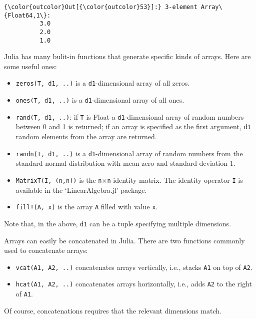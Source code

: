 \documentclass[11pt]{article}
\providecommand{\tightlist}{%
      \setlength{\itemsep}{0pt}\setlength{\parskip}{0pt}}
\begin{document}
\begin{Verbatim}[commandchars=\\\{\}]
{\color{outcolor}Out[{\color{outcolor}53}]:} 3-element Array\{Float64,1\}:
          3.0
          2.0
          1.0
\end{Verbatim}
            
    Julia has many bulit-in functions that generate specific kinds of
arrays. Here are some useful ones:

\begin{itemize}
\tightlist
\item
  \texttt{zeros(T,\ d1,\ ..)} is a \texttt{d1}-dimensional array of all
  zeros.
\item
  \texttt{ones(T,\ d1,\ ..)} is a \texttt{d1}-dimensional array of all
  ones.
\item
  \texttt{rand(T,\ d1,\ ..)}: if \texttt{T} is Float a
  \texttt{d1}-dimensional array of random numbers between 0 and 1 is
  returned; if an array is specified as the first argument, \texttt{d1}
  random elements from the array are returned.
\item
  \texttt{randn(T,\ d1,\ ..)} is a \texttt{d1}-dimensional array of
  random numbers from the standard normal distribution with mean zero
  and standard deviation 1.
\item
  \texttt{MatrixT(I,\ (n,n))} is the \texttt{n}\(\times\)\texttt{n}
  identity matrix. The identity operator \texttt{I} is available in the
  `LinearAlgebra.jl' package.
\item
  \texttt{fill!(A,\ x)} is the array \texttt{A} filled with value
  \texttt{x}.
\end{itemize}

Note that, in the above, \texttt{d1} can be a tuple specifying multiple
dimensions.

Arrays can easily be concatenated in Julia. There are two functions
commonly used to concatenate arrays:

\begin{itemize}
\tightlist
\item
  \texttt{vcat(A1,\ A2,\ ..)} concatenates arrays vertically, i.e.,
  stacks \texttt{A1} on top of \texttt{A2}.
\item
  \texttt{hcat(A1,\ A2,\ ..)} concatenates arrays horizontally, i.e.,
  adds \texttt{A2} to the right of \texttt{A1}.
\end{itemize}

Of course, concatenations requires that the relevant dimensions match.
\end{document}
